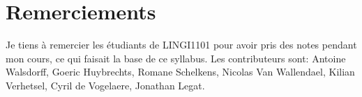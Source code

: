 \section*{Remerciements}

Je tiens à remercier les étudiants de LINGI1101 pour avoir pris des
notes pendant mon cours, ce qui faisait la base de ce syllabus.  Les
contributeurs sont:
Antoine Walsdorff,
Goeric Huybrechts,
Romane Schelkens,
Nicolas Van Wallendael, %
Kilian Verhetsel,
Cyril de Vogelaere,
Jonathan Legat. %

